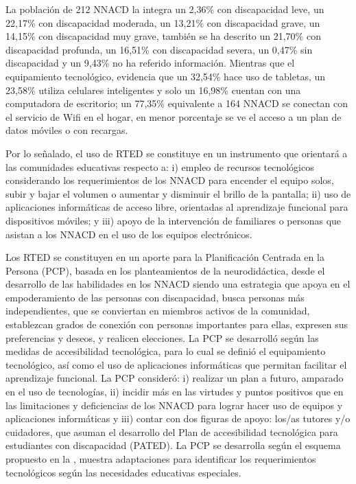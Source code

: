 \documentclass[spanish]{textolivre}
\begin{document}
La población de 212 NNACD la integra un 2,36\% con discapacidad leve, un 22,17\% con discapacidad moderada, un 13,21\% con discapacidad grave, un 14,15\% con discapacidad muy grave, también se ha descrito un 21,70\% con discapacidad profunda, un 16,51\% con discapacidad severa, un 0,47\% sin discapacidad y un 9,43\% no ha referido información. Mientras que el equipamiento tecnológico, evidencia que un 32,54\% hace uso de tabletas, un 23,58\% utiliza celulares inteligentes y solo un 16,98\% cuentan con una computadora de escritorio; un 77,35\% equivalente a 164 NNACD se conectan con el servicio de Wifi en el hogar, en menor porcentaje se ve el acceso a un plan de datos móviles o con recargas.

Por lo señalado, el uso de RTED se constituye en un instrumento que orientará a las comunidades educativas respecto a: i) empleo de recursos tecnológicos considerando los requerimientos de los NNACD para encender el equipo solos, subir y bajar el volumen o aumentar y disminuir el brillo de la pantalla; ii) uso de aplicaciones informáticas de acceso libre, orientadas al aprendizaje funcional para dispositivos móviles; y iii) apoyo de la intervención de familiares o personas que asistan a los NNACD en el uso de los equipos electrónicos.

Los RTED se constituyen en un aporte para la Planificación Centrada en la Persona (PCP), basada en los planteamientos de la neurodidáctica, desde el desarrollo de las habilidades en los NNACD siendo una estrategia que apoya en el empoderamiento de las personas con discapacidad, busca personas más independientes, que se conviertan en miembros activos de la comunidad, establezcan grados de conexión con personas importantes para ellas, expresen sus preferencias y deseos, y realicen elecciones. La PCP se desarrolló según las medidas de accesibilidad tecnológica, para lo cual se definió el equipamiento tecnológico, así como el uso de aplicaciones informáticas que permitan facilitar el aprendizaje funcional. La PCP consideró: i) realizar un plan a futuro, amparado en el uso de tecnologías, ii) incidir más en las virtudes y puntos positivos que en las limitaciones y deficiencias de los NNACD para lograr hacer uso de equipos y aplicaciones informáticas y iii) contar con dos figuras de apoyo: los/as tutores y/o cuidadores, que asuman el desarrollo del Plan de accesibilidad tecnológica para estudiantes con discapacidad (PATED). La PCP se desarrolla según el esquema propuesto en la , muestra adaptaciones para identificar los requerimientos tecnológicos según las necesidades educativas especiales.
\end{document}
